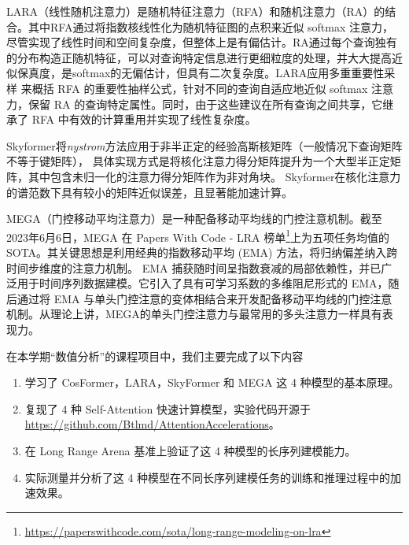 \hspace{0.2cm}

LARA（线性随机注意力）是随机特征注意力（RFA）\cite{peng2021random}和随机注意力（RA）的结合。其中RFA通过将指数核线性化为随机特征图的点积来近似 softmax 注意力，尽管实现了线性时间和空间复杂度，但整体上是有偏估计。RA通过每个查询独有的分布构造正随机特征，可以对查询特定信息进行更细粒度的处理，并大大提高近似保真度，是softmax的无偏估计，但具有二次复杂度。LARA应用多重重要性采样 \cite{veach1995optimally} 来概括 RFA 的重要性抽样公式，针对不同的查询自适应地近似 softmax 注意力，保留 RA 的查询特定属性。同时，由于这些建议在所有查询之间共享，它继承了 RFA 中有效的计算重用并实现了线性复杂度。

\hspace{0.2cm}

Skyformer将\textit{nystrom}方法\cite{williams2001using, drineas2005nystrom}应用于非半正定的经验高斯核矩阵（一般情况下查询矩阵不等于键矩阵），
具体实现方式是将核化注意力得分矩阵提升为一个大型半正定矩阵，其中包含未归一化的注意力得分矩阵作为非对角块。
Skyformer在核化注意力的谱范数下具有较小的矩阵近似误差，且显著能加速计算。

\hspace{0.2cm}

MEGA（门控移动平均注意力）是一种配备移动平均线的门控注意机制。截至2023年6月6日，MEGA 在 Papers With Code - LRA 榜单\footnote{\url{https://paperswithcode.com/sota/long-range-modeling-on-lra}}上为五项任务均值的 SOTA。其关键思想是利用经典的指数移动平均 (EMA) 方法，将归纳偏差纳入跨时间步维度的注意力机制。 EMA 捕获随时间呈指数衰减的局部依赖性，并已广泛用于时间序列数据建模。它引入了具有可学习系数的多维阻尼形式的 EMA，随后通过将 EMA 与单头门控注意的变体相结合来开发配备移动平均线的门控注意机制\cite{hua2022transformer}。从理论上讲，MEGA的单头门控注意力与最常用的多头注意力一样具有表现力。

\hspace{0.2cm}

在本学期“数值分析”的课程项目中，我们主要完成了以下内容
\begin{enumerate}
    \item 学习了 CosFormer，LARA，SkyFormer 和 MEGA 这 4 种模型的基本原理。
    \item 复现了 4 种 Self-Attention 快速计算模型，实验代码开源于 \url{https://github.com/Btlmd/AttentionAccelerations}。
    \item 在 Long Range Arena 基准上验证了这 4 种模型的长序列建模能力。
    \item 实际测量并分析了这 4 种模型在不同长序列建模任务的训练和推理过程中的加速效果。
\end{enumerate}

